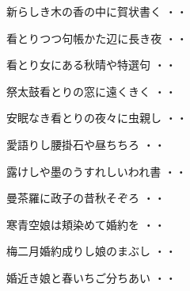 \vspace{0.6cm}
\begin{shiika}新らしき木の香の中に賀状書く
\hfill{・・}\end{shiika}
\vspace{0.6cm}
\begin{shiika}看とりつつ句帳かた辺に長き夜
\hfill{・・}\end{shiika}
\vspace{0.6cm}
\begin{shiika}看とり女にある秋晴や特選句
\hfill{・・}\end{shiika}
\vspace{0.6cm}
\begin{shiika}祭太鼓看とりの窓に遠くきく
\hfill{・・}\end{shiika}
\vspace{0.6cm}
\begin{shiika}安眠なき看とりの夜々に虫親し
\hfill{・・}\end{shiika}
\vspace{0.6cm}
\begin{shiika}愛語りし腰掛石や昼ちちろ
\hfill{・・}\end{shiika}
\vspace{0.6cm}
\begin{shiika}露けしや墨のうすれしいわれ書
\hfill{・・}\end{shiika}
\vspace{0.6cm}
\begin{shiika}曼茶羅に政子の昔秋そぞろ
\hfill{・・}\end{shiika}
\vspace{0.6cm}
\begin{shiika}寒青空娘は頬染めて婚約を
\hfill{・・}\end{shiika}
\vspace{0.6cm}
\begin{shiika}梅二月婚約成りし娘のまぶし
\hfill{・・}\end{shiika}
\vspace{0.6cm}
\begin{shiika}婚近き娘と春いちご分ちあい
\hfill{・・}\end{shiika}
